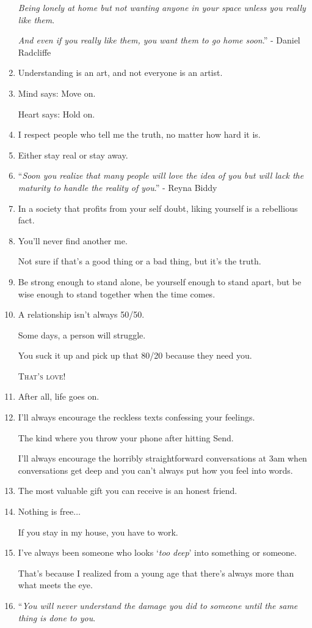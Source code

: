 \documentclass{article}
\begin{document}
\begin{enumerate}
	\textit{Being lonely at home but not wanting anyone in your space unless you really like them}.
	
	\textit{And even if you really like them, you want them to go home soon}.'' - Daniel Radcliffe
	\item Understanding is an art, and not everyone is an artist.
	\item Mind says: Move on.
	
	Heart says: Hold on.
	\item I respect people who tell me the truth, no matter how hard it is.
	\item Either stay real or stay away.
	\item ``\textit{Soon you realize that many people will love the idea of you but will lack the maturity to handle the reality of you}.'' - Reyna Biddy
	\item In a society that profits from your self doubt, liking yourself is a rebellious fact.
	\item You'll never find another me.
	
	Not sure if that's a good thing or a bad thing, but it's the truth.
	\item Be strong enough to stand alone, be yourself enough to stand apart, but be wise enough to stand together when the time comes.
	\item A relationship isn't always 50/50.
	
	Some days, a person will struggle.
	
	You suck it up and pick up that 80/20 because they need you.
	
	\textsc{That's love!}
	\item After all, life goes on.
	\item I'll always encourage the reckless texts confessing your feelings.
	
	The kind where you throw your phone after hitting Send.
	
	I'll always encourage the horribly straightforward conversations at 3am when conversations get deep and you can't always put how you feel into words.
	\item The most valuable gift you can receive is an honest friend.
	\item Nothing is free$\ldots$
	
	If you stay in my house, you have to work.
	\item I've always been someone who looks `\textit{too deep}' into something or someone.
	
	That's because I realized from a young age that there's always more than what meets the eye.
	\item ``\textit{You will never understand the damage you did to someone until the same thing is done to you}.
	

\end{enumerate}
\end{document}
